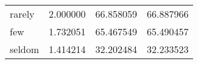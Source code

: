 \begin{table}[ht]
\begin{tabular}{lrrr}
rarely & {\cellcolor[HTML]{FFFFD9}} \color[HTML]{000000} 2.000000 & {\cellcolor[HTML]{FCFED3}} \color[HTML]{000000} 66.858059 & {\cellcolor[HTML]{FCFED3}} \color[HTML]{000000} 66.887966 \\
few & {\cellcolor[HTML]{FFFFD9}} \color[HTML]{000000} 1.732051 & {\cellcolor[HTML]{FCFED3}} \color[HTML]{000000} 65.467549 & {\cellcolor[HTML]{FCFED3}} \color[HTML]{000000} 65.490457 \\
seldom & {\cellcolor[HTML]{FFFFD9}} \color[HTML]{000000} 1.414214 & {\cellcolor[HTML]{FFFFD9}} \color[HTML]{000000} 32.202484 & {\cellcolor[HTML]{FFFFD9}} \color[HTML]{000000} 32.233523 \\
\bottomrule
\end{tabular}
\end{table}
